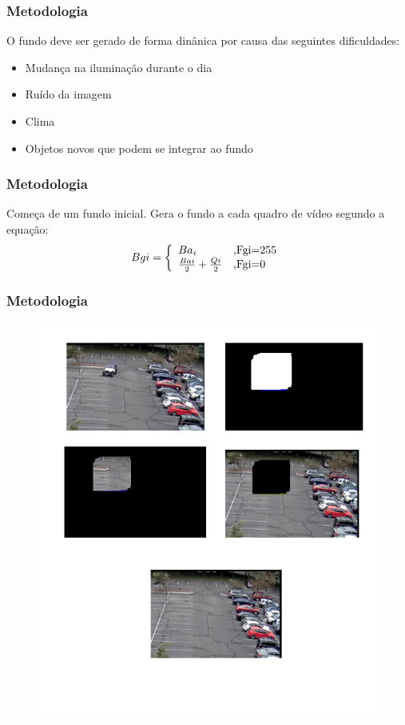 \documentclass{beamer}
\begin{document}
\begin{frame}
\frametitle{Metodologia}
O fundo deve ser gerado de forma dinânica por causa das seguintes dificuldades:
\begin{itemize}
  \item Mudança na iluminação durante o dia
  \item Ruído da imagem
  \item Clima
  \item Objetos novos que podem se integrar ao fundo
\end{itemize}
\end{frame}

\begin{frame}
\frametitle{Metodologia}
    Começa de um fundo inicial.
    Gera o fundo a cada quadro de vídeo segundo a equação:
    \begin{equation}\label{geracaoFundoEquacao}
       Bgi = \left\{
        \begin{array}{l l}
        Ba_{i} & \text{,Fgi=255} \\
        \frac{Bai}{2} + \frac{Qi}{2} & \text{,Fgi=0}\\
         \end{array} \right.
     \end{equation}
\end{frame}

\begin{frame}
\frametitle{Metodologia}
   \begin{figure}
      \includegraphics[width=.6\textwidth]{FiguraFundo}
    \end{figure}
\end{frame}
\end{document}
